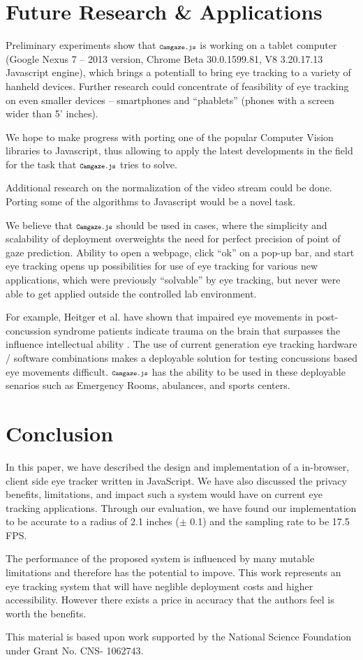 \documentclass[annual]{acmsiggraph}
\newcommand{\Acronym}[1]{\ensuremath{{\small{\texttt{#1}}}}}
\newcommand{\Name}{\Acronym{Camgaze.js}} \newcommand{\False}{\Constant{false}}
\newcommand{\Constant}[1]{\ensuremath{\small{\texttt{#1}}}}
\begin{document}
\section{Future Research \& Applications}

Preliminary experiments show that $\Name$ is working on a tablet computer
(Google Nexus 7 -- 2013 version, Chrome Beta 30.0.1599.81, V8 3.20.17.13
Javascript engine), which brings a potentiall to bring eye tracking to a
variety of hanheld devices. Further research could concentrate of feasibility
of eye tracking on even smaller devices -- smartphones and “phablets” (phones
with a screen wider than 5’ inches).

We hope to make progress with porting one of the popular Computer Vision
libraries to Javascript, thus allowing to apply the latest developments in the
field for the task that $\Name$ tries to solve.

Additional research on the normalization of the video stream could be done.
Porting some of the algorithms to Javascript would be a novel task.

We believe that $\Name$ should be used in cases, where the simplicity and
scalability of deployment overweights the need for perfect precision of point
of gaze prediction. Ability to open a webpage, click “ok” on a pop-up bar, and
start eye tracking opens up possibilities for use of eye tracking for various
new applications, which were previously “solvable” by eye tracking, but never
were able to get applied outside the controlled lab environment.

For example, Heitger et al. have shown that impaired eye movements in
post-concussion syndrome patients indicate trauma on the brain that surpasses
the influence intellectual ability \cite{Heitger2009}. The use of current
generation eye tracking hardware / software combinations makes a deployable
solution for testing concussions based eye movements difficult. $\Name$ has the
ability to be used in these deployable senarios such as Emergency Rooms,
abulances, and sports centers.

\section{Conclusion}

In this paper, we have described the design and implementation of a in-browser,
client side eye tracker written in JavaScript. We have also discussed the
privacy benefits, limitations, and impact such a system would have on current
eye tracking applications. Through our evaluation, we have found our
implementation to be accurate to a radius of 2.1 inches ($\pm$ 0.1) and the
sampling rate to be 17.5 FPS.

The performance of the proposed system is influenced by many mutable
limitations and therefore has the potential to impove. This work represents an
eye tracking system that will have neglible deployment costs and higher
accessibility. However there exists a price in accuracy that the authors feel
is worth the benefits.

This material is based upon work supported by the National Science Foundation
under Grant No. CNS- 1062743.



\end{document}
